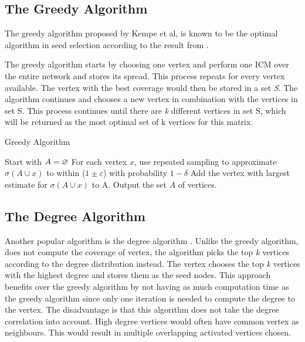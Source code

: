 \subsection{The Greedy Algorithm}
The greedy algorithm \cite{greedyInfluenc2005} \cite{Chen:2009:EIM:1557019.1557047} proposed by Kempe et al, is known to be the optimal algorithm in seed selection according to the result from  \cite{greedyInfluenc2005}.

The greedy algorithm starts by choosing one vertex and perform one ICM over the entire network and stores its spread. This process repeats for every vertex available. The vertex with the best coverage would then be stored in a set \textit{S}. The algorithm continues and chooses a new vertex in combination with the vertices in set S. This process continues until there are \textit{k} different vertices in set S, which will be returned as the most optimal set of k vertices for this matrix. 

 \begin{algorithm}
\caption{Greedy Algorithm}
\begin{algorithmic}[1]
\State Start with $A = \oldemptyset$
\State For each vertex $x$, use repeated sampling to approximate $\sigma(A \cup {x}) $ to within ($1 \pm \varepsilon$) with probability
$1 − \delta$    
\State Add the vertex with largest estimate for $\sigma(A \cup {x})$ to A.
\EndWhile
\State Output the set $A$ of vertices.
\end{algorithmic}
\end{algorithm}

\subsection{The Degree Algorithm}
Another popular algorithm is the degree algorithm \cite{greedyInfluenc2005}. Unlike the greedy algorithm, does not compute the coverage of vertex, the algorithm picks the top \textit{k} vertices according to the degree distribution instead. The vertex chooses the top \textit{k} vertices with the highest degree and stores them as the seed nodes. This approach benefits over the greedy algorithm by not having as much computation time as the greedy algorithm since only one iteration is needed to compute the degree to the vertex. The disadvantage is that this algorithm does not take the degree correlation into account. High degree vertices would often have common vertex as neighbours\citep{ComplexNetwork2003}. This would result in multiple overlapping activated vertices chosen.

